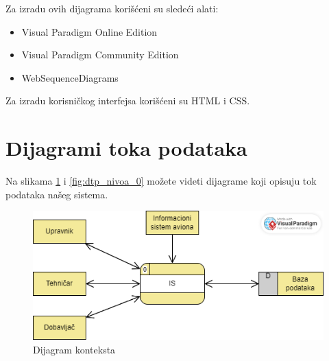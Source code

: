 \documentclass[a4paper]{article}
\begin{document}
Za izradu ovih dijagrama korišćeni su sledeći alati:
    \begin{itemize}
        \item Visual Paradigm Online Edition
        \item Visual Paradigm Community Edition
        \item WebSequenceDiagrams
    \end{itemize}

Za izradu korisničkog interfejsa korišćeni su HTML i CSS.

\pagebreak

\section{Dijagrami toka podataka}
\label{sec:dijagrami_toka_podataka}
Na slikama \ref{fig:dtp_dijagram_konteksta} i \ref{fig:dtp_nivoa_0} možete videti dijagrame koji opisuju tok podataka našeg sistema. 

\begin{figure}[H]
\begin{center}
\includegraphics[scale=0.55]{Dijagrami/Dijagrami_toka_podataka/DTP_dijagram_konteksta.png}
\end{center}
\caption{Dijagram konteksta}
\label{fig:dtp_dijagram_konteksta}
\end{figure}
\end{document}
